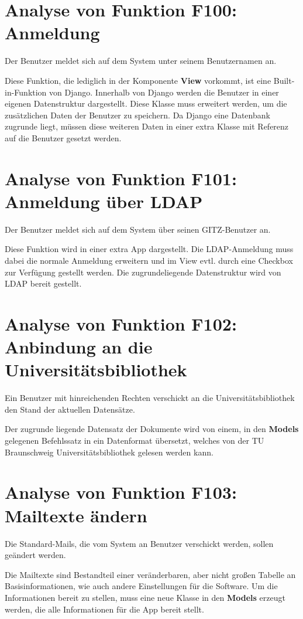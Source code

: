 \section{Analyse von Funktion F100: Anmeldung}
Der Benutzer meldet sich auf dem System unter seinem Benutzernamen an.

Diese Funktion, die lediglich in der Komponente \textbf{View} vorkommt, ist
eine Built-in-Funktion von Django. Innerhalb von Django werden die Benutzer
in einer eigenen Datenstruktur  dargestellt. Diese Klasse muss erweitert werden,
um die zusätzlichen Daten der Benutzer zu speichern. Da Django eine Datenbank
zugrunde liegt, müssen diese weiteren Daten in einer extra Klasse mit Referenz
auf die Benutzer gesetzt werden.

\section{Analyse von Funktion F101: Anmeldung über LDAP}
Der Benutzer meldet sich auf dem System über seinen \Gls{GITZ}-Benutzer an.

Diese Funktion wird in einer extra App dargestellt. Die \gls{LDAP}-Anmeldung muss
dabei die normale Anmeldung erweitern und im View evtl. durch eine Checkbox zur
Verfügung gestellt werden. Die zugrundeliegende Datenstruktur wird von \gls{LDAP}
bereit gestellt.

\section{Analyse von Funktion F102: Anbindung an die Universitätsbibliothek}
Ein Benutzer mit hinreichenden Rechten verschickt an die Universitätsbibliothek
den Stand der aktuellen Datensätze.

Der zugrunde liegende Datensatz der Dokumente wird von einem, in den
\textbf{Models} gelegenen Befehlssatz in ein Datenformat übersetzt, welches von
der TU Braunschweig Universitätsbibliothek gelesen werden kann. 

\section{Analyse von Funktion F103: Mailtexte ändern}
Die Standard-Mails, die vom System an Benutzer verschickt werden, sollen geändert
werden.

Die Mailtexte sind Bestandteil einer veränderbaren, aber nicht großen Tabelle an
Basisinformationen, wie auch andere Einstellungen für die Software. Um die
Informationen bereit zu stellen, muss eine neue Klasse in den \textbf{Models}
erzeugt werden, die alle Informationen für die App bereit stellt.

